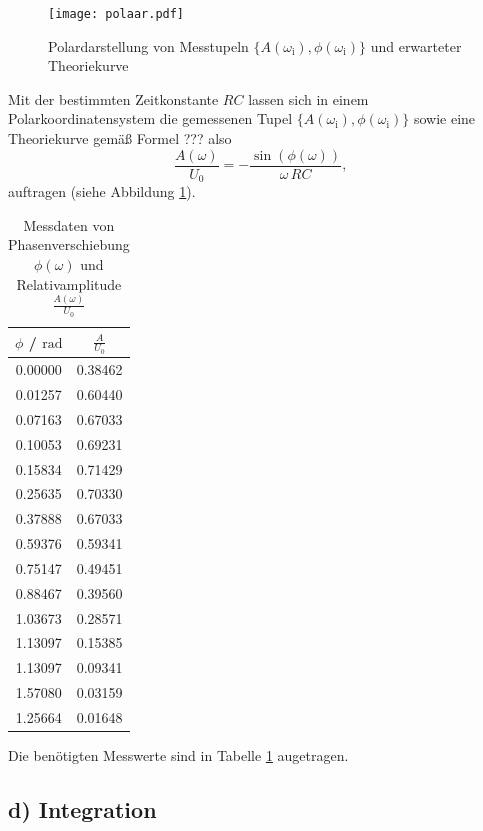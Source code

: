 \begin{figure}
	\centering
	\texttt{[image: polaar.pdf]}
	\caption{Polardarstellung von Messtupeln $\{A(\omega_{\text{i}}), \phi(\omega_{\text{i}}) \}$ und erwarteter Theoriekurve}
	\label{fig:polari}
\end{figure}

Mit der bestimmten Zeitkonstante $RC$ lassen sich in einem Polarkoordinatensystem die gemessenen Tupel $\{A(\omega_{\text{i}}), \phi(\omega_{\text{i}}) \}$ sowie eine Theoriekurve gemäß Formel ??? also
\begin{equation}
	\frac{A({\omega})}{U_0} = - \frac{\sin(\phi(\omega))}{\omega \, RC} \text{,}
\end{equation}
auftragen (siehe Abbildung \ref{fig:polari}).

\begin{table}
	\caption{Messdaten von Phasenverschiebung $\phi(\omega)$ und Relativamplitude $\frac{A(\omega)}{U_0}$}
	\centering
	\label{tab:polars}
\begin{tabular}{cc}
	\toprule
	$\phi$ / $\si{\radian}$ & $\frac{A}{U_0}$ \\
	\midrule
		0.00000 & 0.38462 \\
		0.01257 & 0.60440 \\
		0.07163 & 0.67033 \\
		0.10053 & 0.69231 \\
		0.15834 & 0.71429 \\
		0.25635 & 0.70330 \\
		0.37888 & 0.67033 \\
		0.59376 & 0.59341 \\
		0.75147 & 0.49451 \\
		0.88467 & 0.39560 \\
		1.03673 & 0.28571 \\
		1.13097 & 0.15385 \\
		1.13097 & 0.09341 \\
		1.57080 & 0.03159 \\
		1.25664 & 0.01648 \\
	\bottomrule
\end{tabular}
\end{table}

Die benötigten Messwerte sind in Tabelle \ref{tab:polars} augetragen.
\subsection{d) Integration}

